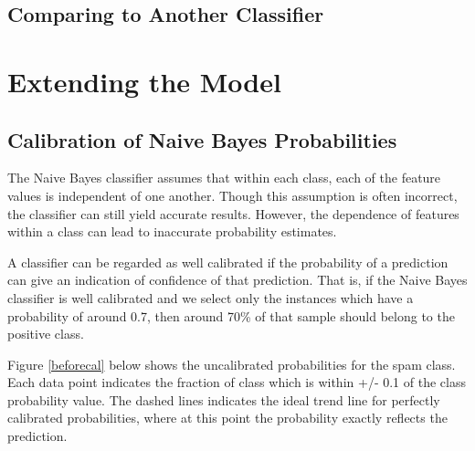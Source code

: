 \documentclass[12pt, a4paper]{article}
\begin{document}
  \subsection{Comparing to Another Classifier}

  \section{Extending the Model}

  \subsection{Calibration of Naive Bayes Probabilities}

	The Naive Bayes classifier assumes that within each class, each of the feature values is independent of one another. Though this assumption is often incorrect, the classifier can still yield accurate results. However, the dependence of features within a class can lead to inaccurate probability estimates.

	A classifier can be regarded as well calibrated if the probability of a prediction can give an indication of confidence of that prediction.  That is, if the Naive Bayes classifier is well calibrated and we select only the instances which have a probability of around 0.7, then around 70\% of that sample should belong to the positive class.

	Figure \ref{beforecal} below shows the uncalibrated probabilities for the spam class. Each data point indicates the fraction of class which is within +/- 0.1 of the class probability value. The dashed lines indicates the ideal trend line for perfectly calibrated probabilities, where at this point the probability exactly reflects the prediction.
\end{document}
